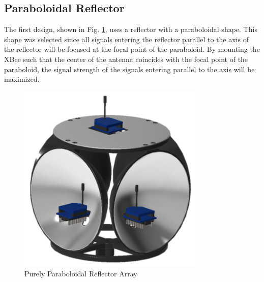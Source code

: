 \subsection{Paraboloidal Reflector}\label{subsec:paraboloidalReflector}
The first design, shown in Fig. \ref{fig:paraboloidalReflector}, uses a reflector with a paraboloidal shape. This shape was selected since all signals entering the reflector parallel to the axis of the reflector will be focused at the focal point of the paraboloid. By mounting the XBee such that the center of the antenna coincides with the focal point of the paraboloid, the signal strength of the signals entering parallel to the axis will be maximized.
\begin{figure}
    \centering
    \includegraphics[width=3.5in]{figs/img/paraboloidalReflector.png}
    \caption{Purely Paraboloidal Reflector Array}
    \label{fig:paraboloidalReflector}
\end{figure}

